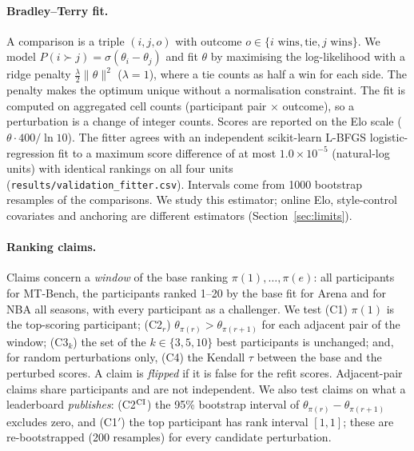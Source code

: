 \documentclass{article}
\begin{document}
\paragraph{Bradley--Terry fit.} A comparison is a triple $(i,j,o)$ with outcome $o\in\{i\text{ wins},\text{tie},j\text{ wins}\}$. We model $P(i\succ j)=\sigma(\theta_i-\theta_j)$ and fit $\theta$ by maximising the log-likelihood with a ridge penalty $\tfrac{\lambda}{2}\lVert\theta\rVert^2$ ($\lambda=1$), where a tie counts as half a win for each side. The penalty makes the optimum unique without a normalisation constraint. The fit is computed on aggregated cell counts (participant pair $\times$ outcome), so a perturbation is a change of integer counts. Scores are reported on the Elo scale ($\theta\cdot400/\ln 10$). The fitter agrees with an independent scikit-learn L-BFGS logistic-regression fit to a maximum score difference of at most $1.0\times10^{-5}$ (natural-log units) with identical rankings on all four units (\texttt{results/validation\_fitter.csv}). Intervals come from 1000 bootstrap resamples of the comparisons. We study this estimator; online Elo, style-control covariates and anchoring are different estimators (Section~\ref{sec:limits}).

\paragraph{Ranking claims.} Claims concern a \emph{window} of the base ranking $\pi(1),\dots,\pi(e)$: all participants for MT-Bench, the participants ranked 1--20 by the base fit for Arena and for NBA all seasons, with every participant as a challenger. We test (C1) $\pi(1)$ is the top-scoring participant; (C2$_r$) $\theta_{\pi(r)}>\theta_{\pi(r+1)}$ for each adjacent pair of the window; (C3$_k$) the set of the $k\in\{3,5,10\}$ best participants is unchanged; and, for random perturbations only, (C4) the Kendall $\tau$ between the base and the perturbed scores. A claim is \emph{flipped} if it is false for the refit scores. Adjacent-pair claims share participants and are not independent. We also test claims on what a leaderboard \emph{publishes}: (C2$^{\rm CI}$) the 95\% bootstrap interval of $\theta_{\pi(r)}-\theta_{\pi(r+1)}$ excludes zero, and (C1$'$) the top participant has rank interval $[1,1]$; these are re-bootstrapped (200 resamples) for every candidate perturbation.
\end{document}
